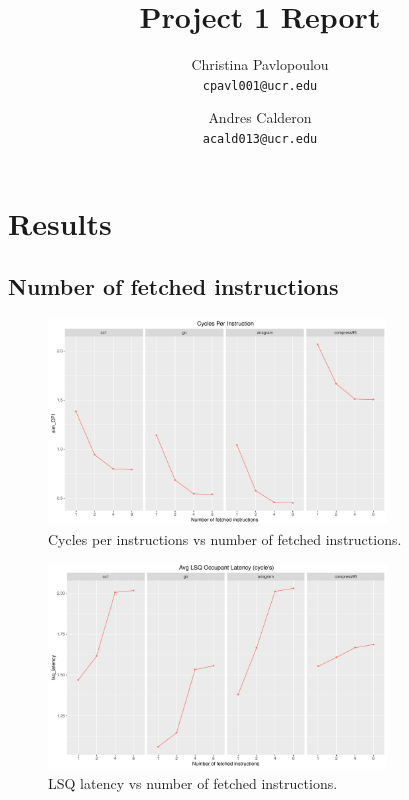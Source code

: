 \documentclass[10pt]{scrartcl}
\title{Project 1 Report}
\author{
   Christina Pavlopoulou\\
  \small \texttt{cpavl001@ucr.edu}
  \and
   Andres Calderon\\
  \small \texttt{acald013@ucr.edu}
}
\begin{document}
\maketitle


\section{Results}

\subsection{Number of fetched instructions}

\begin{figure}[h]
  \centering
  \includegraphics[width=0.8\textwidth]{Plots/plot_F_sim_CPI}
  \caption{Cycles per instructions vs number of fetched instructions.}\label{fig:f_sim_cpi}
\end{figure}

\begin{figure}[h]
  \centering
  \includegraphics[width=0.8\textwidth]{Plots/plot_F_lsq_latency}
  \caption{LSQ latency vs number of fetched instructions.}\label{fig:f_lsq_latency}
\end{figure}

\FloatBarrier
\end{document}
